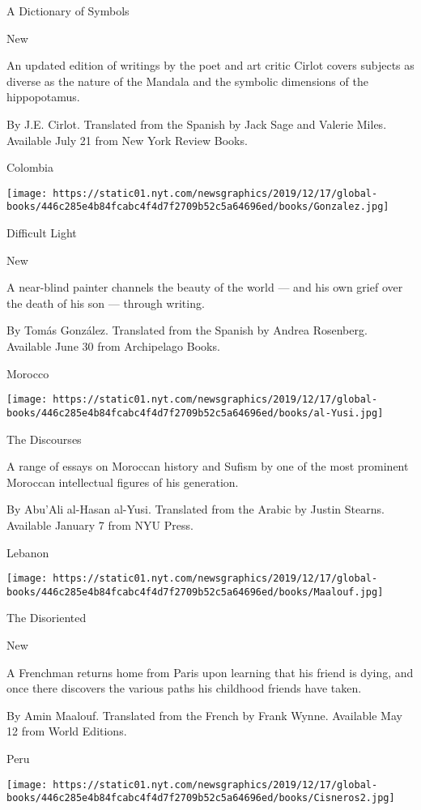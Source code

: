 A Dictionary of Symbols

New

An updated edition of writings by the poet and art critic Cirlot covers
subjects as diverse as the nature of the Mandala and the symbolic
dimensions of the hippopotamus.

 By J.E. Cirlot. Translated from the Spanish by Jack Sage and Valerie
Miles. Available July 21 from New York Review Books.

Colombia

\texttt{[image: https://static01.nyt.com/newsgraphics/2019/12/17/global-books/446c285e4b84fcabc4f4d7f2709b52c5a64696ed/books/Gonzalez.jpg]}

Difficult Light

New

A near-blind painter channels the beauty of the world --- and his own
grief over the death of his son --- through writing.

 By Tomás González. Translated from the Spanish by Andrea Rosenberg.
Available June 30 from Archipelago Books.

Morocco

\texttt{[image: https://static01.nyt.com/newsgraphics/2019/12/17/global-books/446c285e4b84fcabc4f4d7f2709b52c5a64696ed/books/al-Yusi.jpg]}

The Discourses

A range of essays on Moroccan history and Sufism by one of the most
prominent Moroccan intellectual figures of his generation.

 By Abu'Ali al-Hasan al-Yusi. Translated from the Arabic by Justin
Stearns. Available January 7 from NYU Press.

Lebanon

\texttt{[image: https://static01.nyt.com/newsgraphics/2019/12/17/global-books/446c285e4b84fcabc4f4d7f2709b52c5a64696ed/books/Maalouf.jpg]}

The Disoriented

New

A Frenchman returns home from Paris upon learning that his friend is
dying, and once there discovers the various paths his childhood friends
have taken.

 By Amin Maalouf. Translated from the French by Frank Wynne. Available
May 12 from World Editions.

Peru

\texttt{[image: https://static01.nyt.com/newsgraphics/2019/12/17/global-books/446c285e4b84fcabc4f4d7f2709b52c5a64696ed/books/Cisneros2.jpg]}

